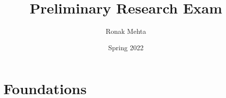 \documentclass[10pt]{article}
\title{Preliminary Research Exam}
\author{Ronak Mehta}
\date{Spring 2022}
\theoremstyle{plain}
\theoremstyle{definition}
\theoremstyle{remark}
\begin{document}
\maketitle
{}

\tableofcontents
\newpage


% 
% 

\clearpage
\appendix

\section{Foundations}
\label{sec:foundation}

\end{document}
